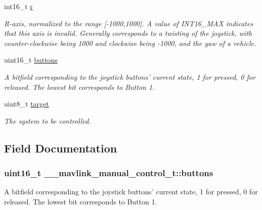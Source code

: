 \begin{DoxyCompactItemize}
int16\+\_\+t \hyperlink{struct____mavlink__manual__control__t_a7311c5d986a66ba78c8f3c62e6163d8b}{r}
\begin{DoxyCompactList}\small\item\em R-\/axis, normalized to the range \mbox{[}-\/1000,1000\mbox{]}. A value of I\+N\+T16\+\_\+\+M\+A\+X indicates that this axis is invalid. Generally corresponds to a twisting of the joystick, with counter-\/clockwise being 1000 and clockwise being -\/1000, and the yaw of a vehicle. \end{DoxyCompactList}\item 
uint16\+\_\+t \hyperlink{struct____mavlink__manual__control__t_addf991277abf6fad36b842fdba36fd89}{buttons}
\begin{DoxyCompactList}\small\item\em A bitfield corresponding to the joystick buttons' current state, 1 for pressed, 0 for released. The lowest bit corresponds to Button 1. \end{DoxyCompactList}\item 
uint8\+\_\+t \hyperlink{struct____mavlink__manual__control__t_ac69f96effc87ea6377989b2350a2a4eb}{target}
\begin{DoxyCompactList}\small\item\em The system to be controlled. \end{DoxyCompactList}\end{DoxyCompactItemize}


\subsection{Field Documentation}
\hypertarget{struct____mavlink__manual__control__t_addf991277abf6fad36b842fdba36fd89}{
\subsubsection[{buttons}]{\setlength{\rightskip}{0pt plus 5cm}uint16\+\_\+t \+\_\+\+\_\+mavlink\+\_\+manual\+\_\+control\+\_\+t\+::buttons}}\label{struct____mavlink__manual__control__t_addf991277abf6fad36b842fdba36fd89}


A bitfield corresponding to the joystick buttons' current state, 1 for pressed, 0 for released. The lowest bit corresponds to Button 1. 

